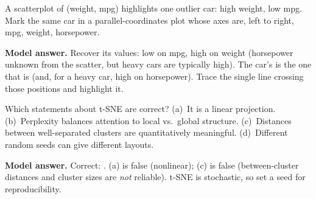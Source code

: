 \begin{qbox}
A scatterplot of (weight, mpg) highlights one outlier car: high weight, low mpg.
Mark the same car in a parallel-coordinates plot whose axes are, left to right,
mpg, weight, horsepower.

\medskip\noindent\textbf{Model answer.}
Recover its values: low on mpg, high on weight (horsepower unknown from the
scatter, but heavy cars are typically high). The car's  is the
one that is  (and, for a
heavy car, high on horsepower). Trace the single line crossing those positions
and highlight it.
\begin{center}
\end{center}
\end{qbox}

\begin{qbox}
Which statements about t-SNE are correct?
(a)~It is a linear projection.
(b)~Perplexity balances attention to local vs.\ global structure.
(c)~Distances between well-separated clusters are quantitatively meaningful.
(d)~Different random seeds can give different layouts.

\medskip\noindent\textbf{Model answer.} Correct: .
(a) is false (nonlinear); (c) is false (between-cluster distances and cluster
sizes are \emph{not} reliable). t-SNE is stochastic, so set a seed for
reproducibility.
\end{qbox}

